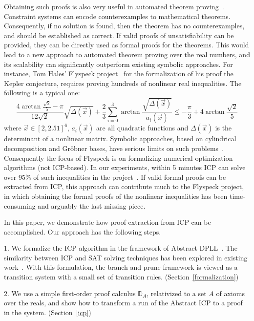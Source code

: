 \documentclass[12pt]{article}
\begin{document}
Obtaining such proofs is also very useful in automated theorem proving~\cite{DBLP:conf/lics/GaoAC12,DBLP:conf/cade/GaoAC12}. Constraint systems can encode counterexamples to mathematical theorems. Consequently, if no solution is found, then the theorem has no counterexamples, and should be established as correct. If valid proofs of unsatisfiability can be provided, they can be directly used as formal proofs for the theorems. This would lead to a new approach to automated theorem proving over the real numbers, and its scalability can significantly outperform existing symbolic approaches. For instance, Tom Hales' Flyspeck project~\cite{DBLP:conf/dagstuhl/Hales05,DBLP:journals/dcg/HalesHMNOZ10} for the formalization of his proof the Kepler conjecture, requires proving hundreds of nonlinear real inequalities. The following is a typical one:
$$\frac{4\arctan\frac{\sqrt 2}{5}-\pi}{12\sqrt2}\sqrt{\Delta(\vec x)}+\frac{2}{3}\sum_{i=0}^3\arctan\frac{\sqrt{\Delta(\vec x)}}{a_i(\vec x)}\leq -\frac{\pi}{3}+4\arctan\frac{\sqrt 2}{5}$$
where $\vec x\in [2, 2.51]^6$,  $a_i(\vec x)$ are all quadratic functions and $\Delta(\vec x)$ is the determinant of a nonlinear matrix. Symbolic approaches, based on cylindrical decomposition and Gr\"obner bases, have serious limits on such problems~\cite{}. Consequently the focus of Flyspeck is on formalizing numerical optimization algorithms (not ICP-based). In our experiments, within 5 minutes ICP can solve over 95\% of such inequalities in the project~\cite{}. If valid formal proofs can be extracted from ICP, this approach can contribute much to the Flyspeck project, in which obtaining the formal proofs of the nonlinear inequalities has been time-consuming and arguably the last missing piece. 

In this paper, we demonstrate how proof extraction from ICP can be accomplished. Our approach has the following steps. 

1. We formalize the ICP algorithm in the framework of Abstract DPLL~\cite{DBLP:journals/jacm/NieuwenhuisOT06}. The similarity between ICP and SAT solving techniques has been explored in existing work~\cite{HySAT}. With this formulation, the branch-and-prune framework is viewed as a transition system with a small set of transition rules. (Section~\ref{formalization})

2. We use a simple first-order proof calculus $\mathbb{D}_A$, relativized to a set $A$ of axioms over the reals, and show how to transform a run of the Abstract ICP to a proof in the system. (Section~\ref{icp})
\end{document}
